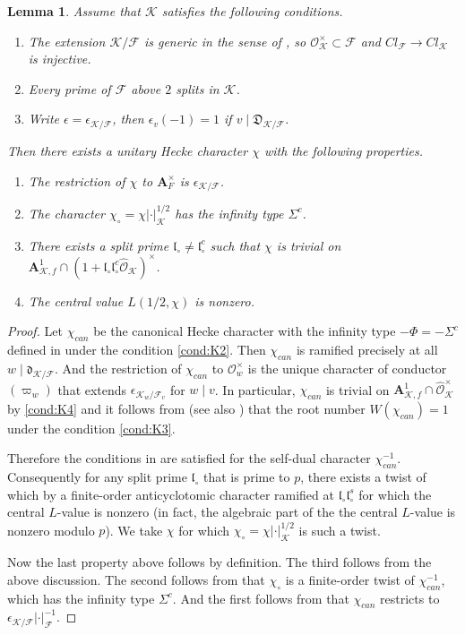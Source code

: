 \documentclass[leqno]{amsart}
\newtheorem{lem}[thm]{Lemma}
\theoremstyle{definition}
\theoremstyle{remark}
\newcommand{\oo}{\mathcal{O}}
\newcommand{\A}{\mathbf A}
\newcommand{\fl}{\mathfrak{l}}
\newcommand{\F}{{\mathcal{F}}} %
\newcommand{\K}{{\mathcal{K}}} %
\newcommand{\qch}{\epsilon} %
\begin{document}
\begin{lem}\label{lem:good_chi}
Assume that $\K$ satisfies the following conditions.
\begin{enumerate}[label=($\K$\arabic*)]
\item The extension $\K/\F$ is generic 
in the sense of \cite{Rohrlich},
so $\oo_\K^\times\subset \F$
and $Cl_\F\to Cl_\K$ is injective.
\label{cond:K2}
\item Every prime of $\F$ above $2$ splits in $\K$.
\label{cond:K3}
\item 
Write $\qch=\qch_{\K/\F}$, 
then $\qch_v(-1)=1$ if $v\mid \mathfrak{D}_{\K/\F}$.
\label{cond:K4}
\end{enumerate}
Then there exists a unitary Hecke character $\chi$
with the following properties.
\begin{enumerate}
\item The restriction of $\chi$ to $\A_F^\times$ is $\qch_{\K/\F}$.
\item The character $\chi_\circ=\chi|\cdot|^{1/2}_\K$
has the infinity type $\Sigma^c$.
\item There exists a split prime $\fl_\circ\neq \fl_\circ^c$
such that $\chi$ is trivial on 
$\A_{\K,f}^1\cap (1+\fl_\circ\fl_\circ^c\widehat{\oo}_\K)^\times$.
\item The central value $L(1/2,\chi)$ is nonzero.
\end{enumerate}
\end{lem}
\begin{proof}

Let $\chi_{can}$
be the canonical Hecke character 
with the infinity type $-\Phi=-\Sigma^c$
defined in \cite{Rohrlich} 
under the condition \ref{cond:K2}.
Then $\chi_{can}$ 
is ramified precisely at all $w\mid \mathfrak{d}_{\K/\F}$.
And the restriction of $\chi_{can}$ to $\oo_w^\times$
is the unique character 
of conductor $(\varpi_w)$ 
that extends $\qch_{\K_w/\F_v}$ for $w\mid v$.
In particular,
$\chi_{can}$ is trivial 
on $\A_{\K,f}^1\cap \widehat{\oo}_\K^\times$
by \ref{cond:K4}
and it follows from \cite[\S 8]{Rohrlich}
(see also \cite[Lem 2.1]{Rod})
that the root number $W(\chi_{can})=1$
under the condition \ref{cond:K3}.

Therefore the conditions in
\cite[Thm A]{Hsieh2012}
are satisfied for the self-dual character
$\chi_{can}^{-1}$.
Consequently for any split prime $\fl_\circ$
that is prime to $p$, there exists 
a twist of which by a finite-order 
anticyclotomic character
ramified at $\fl_\circ\fl^s_\circ$
for which the central $L$-value is nonzero
(in fact, the algebraic part of the 
the central $L$-value is nonzero modulo $p$).
We take $\chi$
for which $\chi_\circ=\chi|\cdot|^{1/2}_\K$
is such a twist.

Now the last property above follows by definition.
The third follows from the above discussion.
The second follows from that 
$\chi_\circ$ is a finite-order twist of $\chi_{can}^{-1}$,
which has the infinity type $\Sigma^c$.
And the first follows from that 
$\chi_{can}$ restricts to $\qch_{\K/\F}|\cdot|^{-1}_\F$.
\end{proof}
\end{document}
